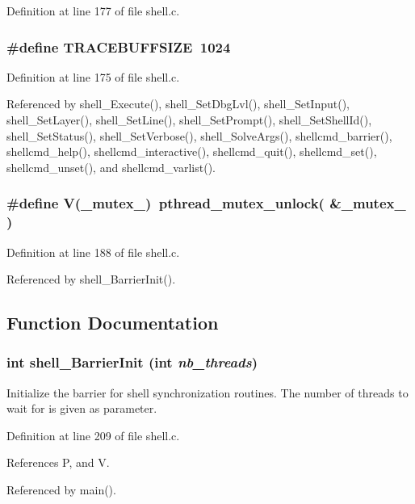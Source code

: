 Definition at line 177 of file shell.c.
\subsubsection{\setlength{\rightskip}{0pt plus 5cm}\#define TRACEBUFFSIZE\ 1024}\label{shell_8c_a1}




Definition at line 175 of file shell.c.

Referenced by shell\_\-Execute(), shell\_\-Set\-Dbg\-Lvl(), shell\_\-Set\-Input(), shell\_\-Set\-Layer(), shell\_\-Set\-Line(), shell\_\-Set\-Prompt(), shell\_\-Set\-Shell\-Id(), shell\_\-Set\-Status(), shell\_\-Set\-Verbose(), shell\_\-Solve\-Args(), shellcmd\_\-barrier(), shellcmd\_\-help(), shellcmd\_\-interactive(), shellcmd\_\-quit(), shellcmd\_\-set(), shellcmd\_\-unset(), and shellcmd\_\-varlist().
\subsubsection{\setlength{\rightskip}{0pt plus 5cm}\#define V(\_\-mutex\_\-)\ pthread\_\-mutex\_\-unlock( \&\_\-mutex\_\- )}\label{shell_8c_a4}




Definition at line 188 of file shell.c.

Referenced by shell\_\-Barrier\-Init().

\subsection{Function Documentation}
\subsubsection{\setlength{\rightskip}{0pt plus 5cm}int shell\_\-Barrier\-Init (int {\em nb\_\-threads})}\label{shell_8c_a12}


Initialize the barrier for shell synchronization routines. The number of threads to wait for is given as parameter. 

Definition at line 209 of file shell.c.

References P, and V.

Referenced by main().
